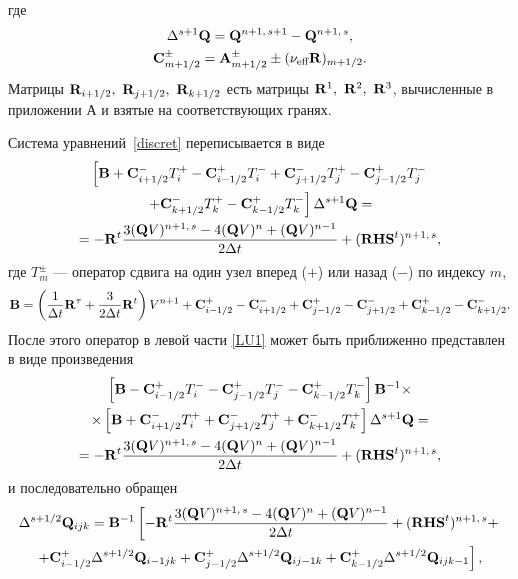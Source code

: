 где 
\begin{gather}
  \Delta^{s + 1}{\bf{Q}} = {\bf{Q}}^{n+1,\,s+1} - {\bf{Q}}^{n + 1,\,s}, \notag \\
  {\bf{C}}_{m + 1/2}^{\pm} = {\bf{A}}_{m + 1/2}^{\pm} \pm (\nu _{\text{eff}}{\bf{R}})_{m+1/2}.
\end{gather}
Матрицы ${\bf{R}}_{i+1/2},\ {\bf{R}}_{j+1/2},\ {\bf{R}}_{k+1/2}$ есть 
матрицы ${\bf{R}}^1,\ {\bf{R}}^2,\ {\bf{R}}^3$, вычисленные в приложении А и взятые на 
соответствующих гранях.

Система уравнений~\eqref{discret} переписывается в виде
\begin{gather}
  \left[{\bf{B}}+{\bf{C}}_{i + 1/2}^- T_i^+ - {\bf{C}}_{i - 1/2}^+ T_i^-
                +{\bf{C}}_{j + 1/2}^- T_j^+ - {\bf{C}}_{j - 1/2}^+ T_j^- \right. \notag \\
        \left.  +{\bf{C}}_{k + 1/2}^- T_k^+ - {\bf{C}}_{k - 1/2}^+ T_k^- \right] \Delta^{s+1}{\bf{Q}} 
        = \label{LU1}\\
        = - {\bf{R}}^t \frac{{3({\bf{Q}}V)^{n + 1,\,s} - 4({\bf{Q}}V)^n + ({\bf{Q}}V)^{n - 1} }}{{2\Delta t}}
        + ({\bf{RHS}}^t )^{n + 1,\,s}, \notag
\end{gather}
где $T_m^{\pm}$ --- оператор сдвига на один узел вперед ($+$) или назад ($-$) по индексу $m$,
\begin{equation}
  {\bf{B}}= \left({\frac{1}{{\Delta t}}{\bf{R}}^\tau + \frac{3}{{2\Delta t}}{\bf{R}}^t}\right)V^{n+1}
   + {\bf{C}}_{i -1/2}^+ - {\bf{C}}_{i +1/2}^- + {\bf{C}}_{j -1/2}^+ - {\bf{C}}_{j +1/2}^- 
   + {\bf{C}}_{k -1/2}^+ - {\bf{C}}_{k +1/2}^-. 
\end{equation}
После этого оператор в левой части \eqref{LU1} может быть приближенно представлен в виде произведения 
\begin{gather}
  \left[{\bf{B}}-{\bf{C}}_{i-1/2}^+T_i^- - {\bf{C}}_{j-1/2}^+T_j^- -{\bf{C}}_{k-1/2}^+T_k^- \right]
  {\bf{B}}^{-1} \times \notag \\ \times
  \left[{\bf{B}}+{\bf{C}}_{i+1/2}^-T_i^+ + {\bf{C}}_{j+1/2}^-T_j^+ +{\bf{C}}_{k+1/2}^-T_k^+ \right]
  \Delta ^{s + 1}{\bf{Q}} = \\ =
  - {\bf{R}}^t \frac{{3({\bf{Q}}V)^{n + 1,\,s} - 4({\bf{Q}}V)^n + ({\bf{Q}}V)^{n - 1} }}{{2\Delta t}}
        + ({\bf{RHS}}^t )^{n + 1,\,s}, \notag
\end{gather}
и последовательно обращен
\begin{gather}
  \Delta^{s+1/2} {\bf{Q}}_{ijk} = {\bf{B}}^{-1} \left[-{\bf{R}}^t 
  \frac{{3({\bf{Q}}V)^{n + 1,\,s} - 4({\bf{Q}}V)^n + ({\bf{Q}}V)^{n-1}}}{{2\Delta t}} + 
  ({\bf{RHS}}^t)^{n+1,\,s} + \right. \notag \\ \left.
  + {\bf{C}}_{i-1/2}^+ \Delta^{s+1/2}{\bf{Q}}_{i - 1jk} + {\bf{C}}_{j-1/2}^+ 
  \Delta^{s+1/2} {\bf{Q}}_{ij - 1k} + {\bf{C}}_{k -1/2}^+ \Delta^{s+1/2} {\bf{Q}}_{ijk-1} \right],
  \label{1step}
\end{gather}
